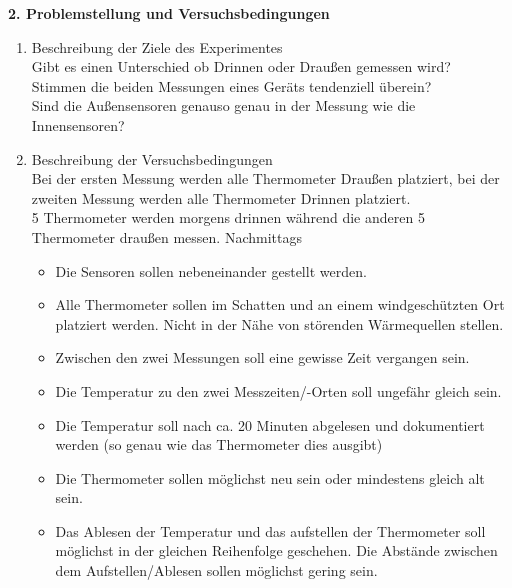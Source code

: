 \documentclass[ ngerman, fontsize= 12pt, paper=a4, headings=big, titlepage=true]{article}
\begin{document}
\textbf{2. Problemstellung und Versuchsbedingungen}
\begin{enumerate}[-]
\item Beschreibung der Ziele des Experimentes \\
	Gibt es einen Unterschied ob Drinnen oder Draußen gemessen wird?\\
	Stimmen die beiden Messungen eines Geräts tendenziell überein?\\
	Sind die Außensensoren genauso genau in der Messung wie die Innensensoren?\\ 
	
\item Beschreibung der Versuchsbedingungen\\
Bei der ersten Messung werden alle Thermometer Draußen platziert, bei der zweiten Messung werden alle Thermometer Drinnen platziert.\\

5 Thermometer werden morgens drinnen  während die anderen 5 Thermometer draußen messen. Nachmittags 
\begin{itemize}
	
\item Die Sensoren sollen nebeneinander gestellt werden.\\

\item Alle Thermometer sollen im Schatten und an einem windgeschützten Ort platziert werden. Nicht in der Nähe von störenden Wärmequellen stellen. \\

\item Zwischen den zwei Messungen soll eine gewisse Zeit vergangen sein.

\item Die Temperatur zu den zwei Messzeiten/-Orten soll ungefähr gleich sein.

\item Die Temperatur soll nach ca. 20 Minuten abgelesen und dokumentiert werden (so genau wie das Thermometer dies ausgibt) 

\item Die Thermometer sollen möglichst neu sein oder mindestens gleich alt sein.

\item Das Ablesen der Temperatur und das aufstellen der Thermometer soll möglichst in der gleichen Reihenfolge geschehen. Die Abstände zwischen dem Aufstellen/Ablesen sollen möglichst gering sein.

\end{itemize}


\end{enumerate}
\end{document}
